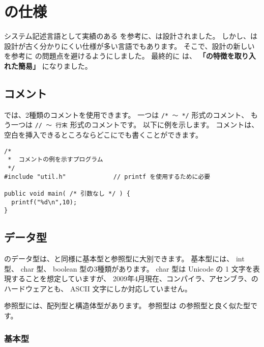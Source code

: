 % 
%
\chapter{\cmml の仕様}

システム記述言語として実績のある \cl を参考に、\cmml は設計されました。
しかし、\cl は設計が古く分かりにくい仕様が多い言語でもあります。
そこで、設計の新しい \javal を参考に \cl の問題点を避けるようにしました。
最終的に \cmml は、
{\bf 「\javal の特徴を取り入れた簡易\cl」} になりました。


\section{コメント}

\cmml では、2種類のコメントを使用できます。
一つは \verb!/* 〜 */! 形式のコメント、
もう一つは \verb!// 〜 行末! 形式のコメントです。
以下に例を示します。
コメントは、空白を挿入できるところならどこにでも書くことができます。

\begin{mylist}
\begin{verbatim}
/*
 *  コメントの例を示すプログラム
 */
#include "util.h"             // printf を使用するために必要

public void main( /* 引数なし */ ) {
  printf("%d\n",10);
}

\end{verbatim}
\end{mylist}


\section{データ型}

\cmml のデータ型は、\javal と同様に基本型と参照型に大別できます。
基本型には、 int 型、 char 型、 boolean 型の3種類があります。
char 型は Unicode の 1 文字を表現することを想定していますが、
2009年4月現在、コンパイラ、アセンブラ、\tac のハードウェアとも、
ASCII 文字にしか対応していません。

参照型には、配列型と構造体型があります。
参照型は \javal の参照型と良く似た型です。

\subsection{基本型}

